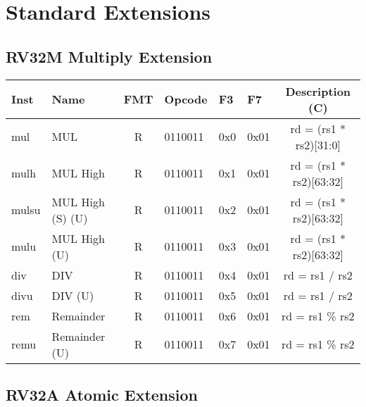 
\section*{Standard Extensions}

\subsection*{RV32M Multiply Extension}
\begin{center}
\begin{tabular}
{T | l | c | T | T | T | C } \hline
\rm Inst & Name              & FMT & \rm Opcode & \rm F3 & \rm F7 & \rm Description (C)     \\ \hline
mul      & MUL               & R   & 0110011    & 0x0    & 0x01   & rd = (rs1 * rs2)[31:0]  \\
mulh     & MUL High          & R   & 0110011    & 0x1    & 0x01   & rd = (rs1 * rs2)[63:32] \\
mulsu    & MUL High (S) (U)  & R   & 0110011    & 0x2    & 0x01   & rd = (rs1 * rs2)[63:32] \\
mulu     & MUL High (U)      & R   & 0110011    & 0x3    & 0x01   & rd = (rs1 * rs2)[63:32] \\
div      & DIV               & R   & 0110011    & 0x4    & 0x01   & rd = rs1 / rs2          \\
divu     & DIV (U)           & R   & 0110011    & 0x5    & 0x01   & rd = rs1 / rs2          \\
rem      & Remainder         & R   & 0110011    & 0x6    & 0x01   & rd = rs1 \% rs2         \\
remu     & Remainder (U)     & R   & 0110011    & 0x7    & 0x01   & rd = rs1 \% rs2         \\
\hline
\end{tabular}
\end{center}

\subsection*{RV32A Atomic Extension}

\

